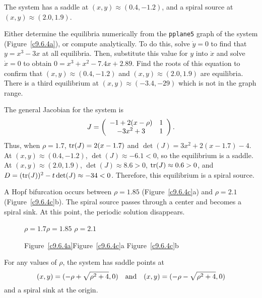 \documentclass{ximera}
\begin{document}
\begin{figure}[htb]
                       \centerline{%
                       }
\end{figure}

\ans The system has a saddle at $(x,y) \approx (0.4,-1.2)$, and a 
spiral source at $(x,y) \approx (2.0,1.9)$.

\soln Either determine the equilibria numerically from the {\tt pplane5}
graph of the system (Figure~\ref{c9.6.4a}), or compute analytically.  To
do this, solve $\dot{y} = 0$ to find that $y = x^3 - 3x$ at all equilibria.
Then, substitute this value for $y$ into $\dot{x}$ and solve $\dot{x} = 0$
to obtain $0 = x^3 + x^2 - 7.4x + 2.89$.  Find the roots of this equation
to confirm that $(x,y) \approx (0.4,-1.2)$ and $(x,y) \approx (2.0,1.9)$
are equilibria.  There is a third equilibrium at $(x,y) \approx
(-3.4,-29)$ which is not in the graph range.

\para The general Jacobian for the system is
\[
J = \left(\begin{array}{cc} -1 + 2(x - \rho) & 1\\ -3x^2 + 3 &1\end{array}\right).
\]
Thus, when $\rho = 1.7$, ${\rm tr}(J) = 2(x - 1.7)$ and
$\det(J) = 3x^2 + 2(x - 1.7) - 4$.  At $(x,y) \approx (0.4,-1.2)$,
$\det(J) \approx -6.1 < 0$, so the equilibrium is a saddle.  At
$(x,y) \approx (2.0,1.9)$, $\det(J) \approx 8.6 > 0$, ${\rm tr}(J) \approx
0.6 > 0$, and $D = ({\rm tr}(J))^2 - t\det(J) \approx -34 < 0$.  Therefore,
this equilibrium is a spiral source.

 A Hopf bifurcation occurs between $\rho = 1.85$
(Figure~\ref{c9.6.4c}a) and $\rho = 2.1$ (Figure~\ref{c9.6.4c}b).  The
spiral source passes through a center and becomes a
spiral sink.  At this point, the periodic solution disappears.

\begin{figure}[htb]
                       \centerline{%
                       }
	\centerline{$\rho = 1.7$\hspace{1.3in}$\rho = 1.85$\hspace{1.3in}
$\rho = 2.1$}
	\centerline{Figure~\ref{c9.6.4a}\hspace{1.2in}Figure~\ref{c9.6.4c}a
\hspace{1.2in}Figure~\ref{c9.6.4c}b}
\end{figure}

\ans For any values of $\rho$, the system has saddle points at
\[
(x,y) = (-\rho + \sqrt{\rho^2 + 4},0) \quad\mbox{and}\quad
(x,y) = (-\rho - \sqrt{\rho^2 + 4},0)
\]
and a spiral sink at the origin.
\end{document}
